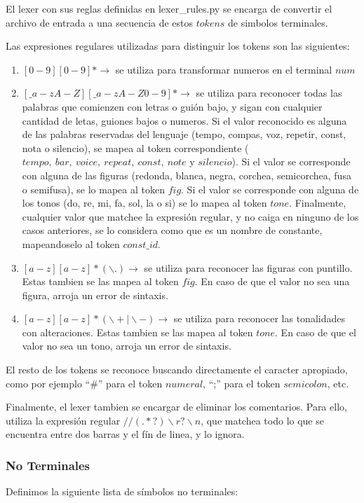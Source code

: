 \documentclass[a4paper, 10pt, twoside]{article}
\begin{document}
El lexer con sus reglas definidas en lexer\_rules.py se encarga de convertir el archivo de entrada a una secuencia de estos $tokens$ de simbolos terminales.

Las expresiones regulares utilizadas para distinguir los tokens son las siguientes: 
\begin{enumerate}
\item	$[0-9][0-9]* \rightarrow$ se utiliza para transformar numeros en el terminal $num$ \\
\item	$[\_a-zA-Z][\_a-zA-Z0-9]* \rightarrow$ se utiliza para reconocer todas las palabras que comienzen con letras o guión bajo, y sigan con cualquier cantidad de letas, guiones bajos o numeros. Si el valor reconocido es alguna de las palabras reservadas del lenguaje (tempo, compas, voz, repetir, const, nota o silencio), se mapea al token correspondiente ($tempo,\ bar,\ voice,\ repeat,\ const,\ note$ y $silencio$). Si el valor se corresponde con alguna de las figuras (redonda, blanca, negra, corchea, semicorchea, fusa o semifusa), se lo mapea al token $fig$. Si el valor se corresponde con alguna de los tonos (do, re, mi, fa, sol, la o si) se lo mapea al token $tone$. Finalmente, cualquier valor que matchee la expresión regular, y no caiga en ninguno de los casos anteriores, se lo considera como que es un nombre de constante, mapeandoselo al token $const\_id$.
\item $[a-z][a-z]*(\backslash .) \rightarrow$ se utiliza para reconocer las figuras con puntillo. Estas tambien se las mapea al token $fig$. En caso de que el valor no sea una figura, arroja un error de sintaxis.
\item $[a-z][a-z]*(\backslash + \mid \backslash -) \rightarrow$ se utiliza para reconocer las tonalidades con alteraciones. Estas tambien se las mapea al token $tone$. En caso de que el valor no sea un tono, arroja un error de sintaxis.
\end{enumerate}

El resto de los tokens se reconoce buscando directamente el caracter apropiado, como por ejemplo ``\#'' para el token $numeral$, ``;'' para el token $semicolon$, etc.

Finalmente, el lexer tambien se encargar de eliminar los comentarios. Para ello, utiliza la expresión regular $//(.*?)\backslash r?\backslash n$, que matchea todo lo que se encuentra entre dos barras y el fín de linea, y lo ignora.

\subsubsection{No Terminales}
Definimos la siguiente lista de símbolos no terminales:
\end{document}
